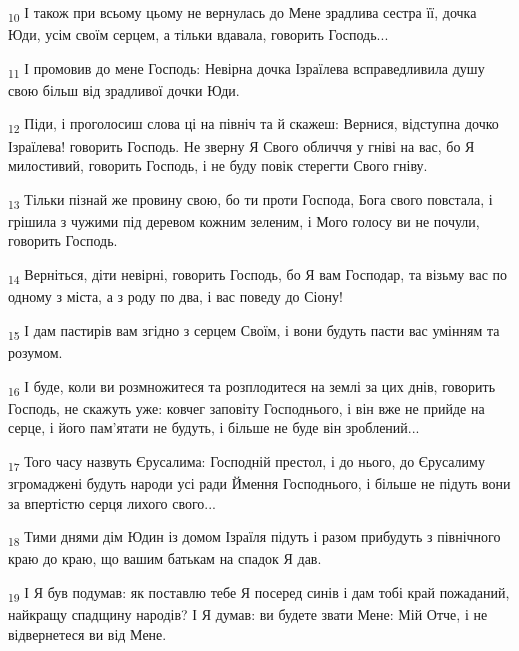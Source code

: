 \begin{tcolorbox}
\textsubscript{10} І також при всьому цьому не вернулась до Мене зрадлива сестра її, дочка Юди, усім своїм серцем, а тільки вдавала, говорить Господь...
\end{tcolorbox}
\begin{tcolorbox}
\textsubscript{11} І промовив до мене Господь: Невірна дочка Ізраїлева всправедливила душу свою більш від зрадливої дочки Юди.
\end{tcolorbox}
\begin{tcolorbox}
\textsubscript{12} Піди, і проголосиш слова ці на північ та й скажеш: Вернися, відступна дочко Ізраїлева! говорить Господь. Не зверну Я Свого обличчя у гніві на вас, бо Я милостивий, говорить Господь, і не буду повік стерегти Свого гніву.
\end{tcolorbox}
\begin{tcolorbox}
\textsubscript{13} Тільки пізнай же провину свою, бо ти проти Господа, Бога свого повстала, і грішила з чужими під деревом кожним зеленим, і Мого голосу ви не почули, говорить Господь.
\end{tcolorbox}
\begin{tcolorbox}
\textsubscript{14} Верніться, діти невірні, говорить Господь, бо Я вам Господар, та візьму вас по одному з міста, а з роду по два, і вас поведу до Сіону!
\end{tcolorbox}
\begin{tcolorbox}
\textsubscript{15} І дам пастирів вам згідно з серцем Своїм, і вони будуть пасти вас умінням та розумом.
\end{tcolorbox}
\begin{tcolorbox}
\textsubscript{16} І буде, коли ви розмножитеся та розплодитеся на землі за цих днів, говорить Господь, не скажуть уже: ковчег заповіту Господнього, і він вже не прийде на серце, і його пам'ятати не будуть, і більше не буде він зроблений...
\end{tcolorbox}
\begin{tcolorbox}
\textsubscript{17} Того часу назвуть Єрусалима: Господній престол, і до нього, до Єрусалиму згромаджені будуть народи усі ради Ймення Господнього, і більше не підуть вони за впертістю серця лихого свого...
\end{tcolorbox}
\begin{tcolorbox}
\textsubscript{18} Тими днями дім Юдин із домом Ізраїля підуть і разом прибудуть з північного краю до краю, що вашим батькам на спадок Я дав.
\end{tcolorbox}
\begin{tcolorbox}
\textsubscript{19} І Я був подумав: як поставлю тебе Я посеред синів і дам тобі край пожаданий, найкращу спадщину народів? І Я думав: ви будете звати Мене: Мій Отче, і не відвернетеся ви від Мене.
\end{tcolorbox}
